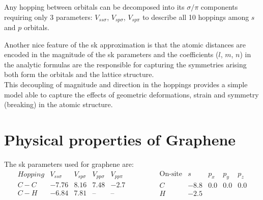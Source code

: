 Any hopping between orbitals can be decomposed into its $\sigma/\pi$ components requiring only 3 parameters: $V_{ss\sigma}$, $V_{sp\sigma}$, $V_{sp\pi}$ to describe all 10 hoppings among $s$ and $p$ orbitals.


Another nice feature of the \ac{sk} approximation is that the atomic distances are encoded in the magnitude of the \ac{sk} parameters and the coefficients ($l$, $m$, $n$) in the analytic formulas are the responsible for capturing the symmetries arising both form the orbitals and the lattice structure.\\

This decoupling of magnitude and direction in the hoppings provides a simple model able to capture the effects of geometric deformations, strain and symmetry (breaking) in the atomic structure.
%
%
%
%
%



\section{Physical properties of Graphene}
The \ac{sk} parameters used for graphene are:
\begin{equation}
  \begin{array}{l|cccc}
    Hopping & V_{ss\sigma} & V_{sp\sigma} & V_{pp\sigma} & V_{pp\pi} \\ \hline
    C-C & -7.76 & 8.16 & 7.48 & -2.7 \\
    C-H & -6.84 & 7.81 & \text{--} & \text{--}
  \end{array}\qquad\qquad
  \begin{array}{c|cccc}
    \text{On-site} & s & p_x & p_y & p_z \\ \hline
    C & -8.8 & 0.0 & 0.0 & 0.0 \\
    H & -2.5 &     &     &
  \end{array}
\label{SK_params}
\end{equation}

